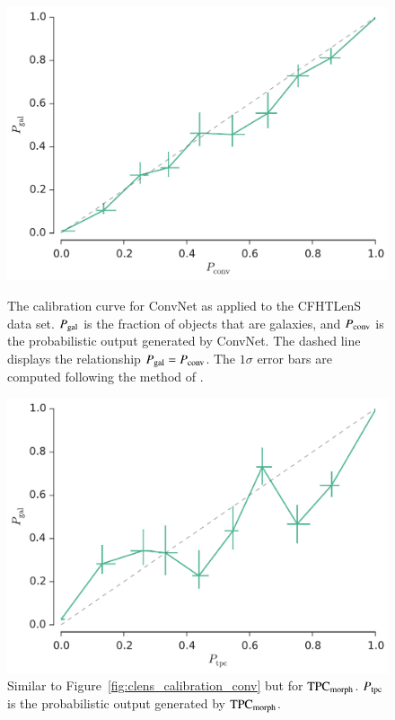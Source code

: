 \documentclass[fleqn,usenatbib]{mnras}
\begin{document}
\begin{figure}
  \centering
  \begin{minipage}[c]{0.49\textwidth}
    \centering
    \includegraphics[width=\textwidth]{figures/clens_calibration_conv.pdf}
    \caption{
      The calibration curve for ConvNet as applied to the CFHTLenS data set.
      $P_{{\mathrm{gal}}}$ is the fraction of objects that are galaxies, and
      $P_{{\mathrm{conv}}}$ is the probabilistic output generated by ConvNet.
      The dashed line displays the relationship
      $P_{{\mathrm{gal}}} = P_{{\mathrm{conv}}}$.
      The $1 \sigma$ error bars are computed following the method
      of \citet{paterno2004calculating}.
      }
    \label{fig:clens_calibration_conv}
  \end{minipage}
  \hfill
  \begin{minipage}[c]{0.49\textwidth}
    \includegraphics[width=\textwidth]{figures/clens_calibration_tpc.pdf}
    \caption{Similar to Figure~\ref{fig:clens_calibration_conv} but for
      ${\mathrm{TPC}}_{{\mathrm{morph}}}$.
      $P_{{\mathrm{tpc}}}$ is the probabilistic output generated by ${\mathrm{TPC}}_{{\mathrm{morph}}}$.}
    \label{fig:clens_calibration_tpc}
  \end{minipage}
\end{figure}
\end{document}
